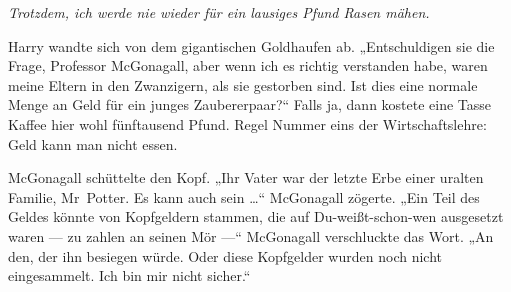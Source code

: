 \emph{Trotzdem, ich werde nie wieder für ein lausiges Pfund Rasen mähen.}

Harry wandte sich von dem gigantischen Goldhaufen ab.
„Entschuldigen sie die Frage, Professor McGonagall, aber wenn ich es richtig verstanden habe, waren meine Eltern in den Zwanzigern, als sie gestorben sind. Ist dies eine normale Menge an Geld für ein junges Zaubererpaar?“ Falls ja, dann kostete eine Tasse Kaffee hier wohl fünftausend Pfund. Regel Nummer eins der Wirtschaftslehre: Geld kann man nicht essen.

McGonagall schüttelte den Kopf.
„Ihr Vater war der letzte Erbe einer uralten Familie, Mr~Potter. Es kann auch sein …“ McGonagall zögerte.
„Ein Teil des Geldes könnte von Kopfgeldern stammen, die auf Du-weißt-schon-wen ausgesetzt waren — zu zahlen an seinen Mör —“ McGonagall verschluckte das Wort.
„An den, der ihn besiegen würde. Oder diese Kopfgelder wurden noch nicht eingesammelt. Ich bin mir nicht sicher.“

